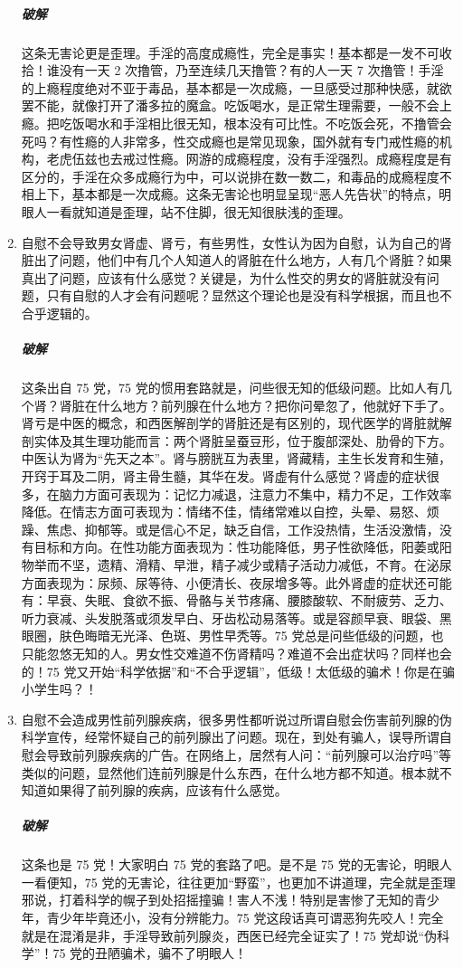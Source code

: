 \begin{enumerate}
    \subparagraph{破解} 这条无害论更是歪理。手淫的高度成瘾性，完全是事实！基本都是一发不可收拾！谁没有一天 2 次撸管，乃至连续几天撸管？有的人一天 7 次撸管！手淫的上瘾程度绝对不亚于毒品，基本都是一次成瘾，一旦感受过那种快感，就欲罢不能，就像打开了潘多拉的魔盒。吃饭喝水，是正常生理需要，一般不会上瘾。把吃饭喝水和手淫相比很无知，根本没有可比性。不吃饭会死，不撸管会死吗？有性瘾的人非常多，性交成瘾也是常见现象，国外就有专门戒性瘾的机构，老虎伍兹也去戒过性瘾。网游的成瘾程度，没有手淫强烈。成瘾程度是有区分的，手淫在众多成瘾行为中，可以说排在数一数二，和毒品的成瘾程度不相上下，基本都是一次成瘾。这条无害论也明显呈现“恶人先告状”的特点，明眼人一看就知道是歪理，站不住脚，很无知很肤浅的歪理。
    \item 自慰不会导致男女肾虚、肾亏，有些男性，女性认为因为自慰，认为自己的肾脏出了问题，他们中有几个人知道人的肾脏在什么地方，人有几个肾脏？如果真出了问题，应该有什么感觉？关键是，为什么性交的男女的肾脏就没有问题，只有自慰的人才会有问题呢？显然这个理论也是没有科学根据，而且也不合乎逻辑的。
    \subparagraph{破解} 这条出自 75 党，75 党的惯用套路就是，问些很无知的低级问题。比如人有几个肾？肾脏在什么地方？前列腺在什么地方？把你问晕忽了，他就好下手了。肾亏是中医的概念，和西医解剖学的肾脏还是有区别的，现代医学的肾脏就解剖实体及其生理功能而言：两个肾脏呈蚕豆形，位于腹部深处、肋骨的下方。中医认为肾为“先天之本”。肾与膀胱互为表里，肾藏精，主生长发育和生殖，开窍于耳及二阴，肾主骨生髓，其华在发。肾虚有什么感觉？肾虚的症状很多，在脑力方面可表现为：记忆力减退，注意力不集中，精力不足，工作效率降低。在情志方面可表现为：情绪不佳，情绪常难以自控，头晕、易怒、烦躁、焦虑、抑郁等。或是信心不足，缺乏自信，工作没热情，生活没激情，没有目标和方向。在性功能方面表现为：性功能降低，男子性欲降低，阳萎或阳物举而不坚，遗精、滑精、早泄，精子减少或精子活动力减低，不育。在泌尿方面表现为：尿频、尿等待、小便清长、夜尿增多等。此外肾虚的症状还可能有：早衰、失眠、食欲不振、骨骼与关节疼痛、腰膝酸软、不耐疲劳、乏力、听力衰减、头发脱落或须发早白、牙齿松动易落等。或是容颜早衰、眼袋、黑眼圈，肤色晦暗无光泽、色斑、男性早秃等。75 党总是问些低级的问题，也只能忽悠无知的人。男女性交难道不伤肾精吗？难道不会出症状吗？同样也会的！75 党又开始“科学依据”和“不合乎逻辑”，低级！太低级的骗术！你是在骗小学生吗？！
    \item 自慰不会造成男性前列腺疾病，很多男性都听说过所谓自慰会伤害前列腺的伪科学宣传，经常怀疑自己的前列腺出了问题。现在，到处有骗人，误导所谓自慰会导致前列腺疾病的广告。在网络上，居然有人问：“前列腺可以治疗吗”等类似的问题，显然他们连前列腺是什么东西，在什么地方都不知道。根本就不知道如果得了前列腺的疾病，应该有什么感觉。
    \subparagraph{破解} 这条也是 75 党！大家明白 75 党的套路了吧。是不是 75 党的无害论，明眼人一看便知，75 党的无害论，往往更加“野蛮”，也更加不讲道理，完全就是歪理邪说，打着科学的幌子到处招摇撞骗！害人不浅！特别是害惨了无知的青少年，青少年毕竟还小，没有分辨能力。75 党这段话真可谓恶狗先咬人！完全就是在混淆是非，手淫导致前列腺炎，西医已经完全证实了！75 党却说“伪科学”！75 党的丑陋骗术，骗不了明眼人！

\end{enumerate}
